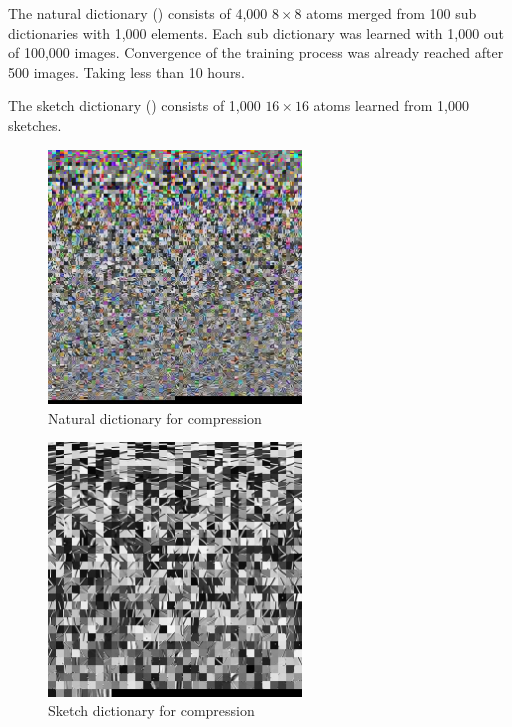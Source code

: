 The natural dictionary () consists of 4,000 $8 \times
8$ atoms merged from 100 sub dictionaries with 1,000 elements. Each sub
dictionary was learned with 1,000 out of 100,000 images. Convergence of the
training process was already reached after 500 images. Taking less than 10
hours.

The sketch dictionary () consists of 1,000
$16\times 16$ atoms learned from 1,000 sketches.

\newpage
\begin{figure}[H]
\centering
\includegraphics[width = 0.6\textwidth]{images/natural_dict.jpg}
\caption{Natural dictionary for compression}\label{fig:naturalDict}
\end{figure}
\begin{figure}[H]
\centering
\includegraphics[width = 0.6\textwidth]{images/sketch_dict.jpg}
\caption{Sketch dictionary for compression}\label{fig:sketchDict}
\end{figure}


\clearpage
